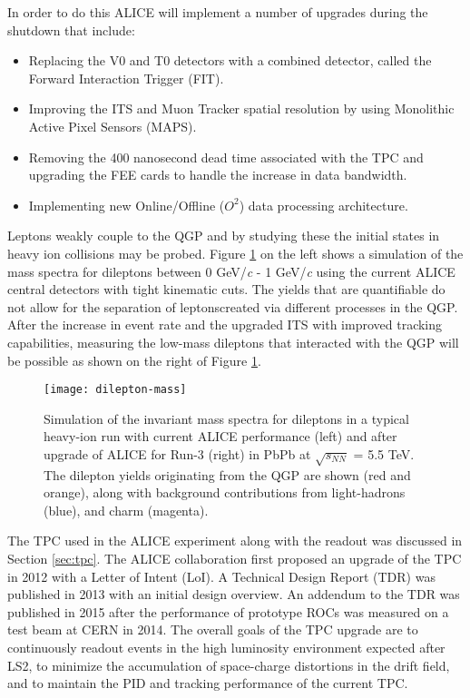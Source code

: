 \noindent
In order to do this ALICE will implement a number of upgrades \cite{1742-6596-589-1-012014} during the shutdown that include:

\begin{itemize}
\item Replacing the V0 and T0 detectors with a combined detector, called the Forward Interaction Trigger (FIT)\cite{1742-6596-798-1-012186}.
\item Improving the ITS and Muon Tracker spatial resolution by using  Monolithic Active Pixel Sensors (MAPS)\cite{Abelev:1625842}\cite{CERN-LHCC-2015-001}.
\item Removing the 400 nanosecond dead time associated with the TPC and upgrading the FEE cards to handle the increase in data bandwidth\cite{Abelev:1475243}.
\item Implementing new Online/Offline ($O^{2}$) data processing architecture\cite{Buncic:2011297}.
\end{itemize}

Leptons weakly couple to the QGP\cite{Ryblewski:2015sha} and by studying these the initial states in heavy ion collisions may be probed\cite{Mauricio:2007vz}.  Figure \ref{fig:lowmassdilep} on the left shows a simulation of the mass spectra for dileptons between 0 GeV/\textit{c} - 1 GeV/\textit{c} using the current ALICE central detectors with tight kinematic cuts.  The yields that are quantifiable do not allow for the separation of leptonscreated via different processes in the QGP.  After the increase in event rate and the upgraded ITS with improved tracking capabilities, measuring the low-mass dileptons that interacted with the QGP will be possible as shown on the right of Figure \ref{fig:lowmassdilep}. 

\begin{figure}[h]
\texttt{[image: dilepton-mass]}
\centering
\caption{Simulation of the invariant  mass spectra for dileptons in a typical heavy-ion run with current ALICE performance (left) and after upgrade of ALICE for Run-3 (right) in PbPb at $\sqrt{s_{NN}}$ = 5.5 TeV.  The dilepton yields originating from the QGP are shown (red and orange), along with background contributions from light-hadrons (blue), and charm (magenta)\cite{Abelev:1475243}.}
\label{fig:lowmassdilep}
\end{figure}


The TPC used in the ALICE experiment along with the readout was discussed in Section \ref{sec:tpc}.  The ALICE collaboration first proposed an upgrade of the TPC in 2012 with a Letter of Intent (LoI)\cite{Abelev:1475243}.  A Technical Design Report (TDR)\cite{CERN-LHCC-2013-020} was published in 2013 with an initial design overview.  An addendum to the TDR\cite{CERN-LHCC-2015-002} was published in 2015 after the performance of prototype ROCs was measured on a test beam at CERN in 2014.  The overall goals of the TPC upgrade are to continuously readout events in the high luminosity environment expected after LS2, to minimize the accumulation of space-charge distortions in the drift field, and to maintain the PID and tracking performance of the current TPC.


